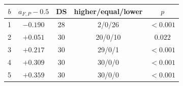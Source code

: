 \centering\footnotesize\begin{tabular}{@{}ccccc@{}}\toprule
$b$ & $a_{F,P} - 0.5$ & DS & higher/equal/lower & $p$ \\ \midrule
1 & $-0.190$ & 28 & 2/0/26 & $<0.001$ \\
2 & $+0.051$ & 30 & 20/0/10 & $0.022$ \\
3 & $+0.217$ & 30 & 29/0/1 & $<0.001$ \\
4 & $+0.309$ & 30 & 30/0/0 & $<0.001$ \\
5 & $+0.359$ & 30 & 30/0/0 & $<0.001$ \\
\bottomrule\end{tabular}
